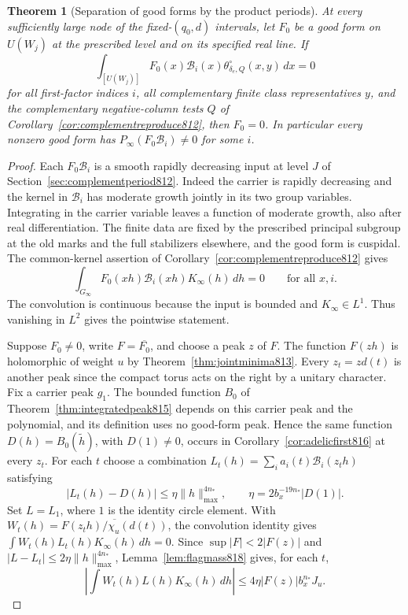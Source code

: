 \documentclass[a4paper,11pt]{article}
\newtheorem{theorem}[proposition]{Theorem}
\theoremstyle{definition}
\theoremstyle{remark}
\numberwithin{equation}{section}
\begin{document}
\begin{theorem}[Separation of good forms by the product periods]
\leavevmode\label{thm:complexseparation818}
At every sufficiently large node of the fixed-\((q_0,d)\)
intervals, let \(F_0\) be a good form on \(U(W_j)\) at the
prescribed level and on its specified real line. If
\[
 \int_{[U(W_j)]} F_0(x)\mathcal B_i(x)
                  \theta^\circ_{\delta_e,Q}(x,y)\,dx=0
\]
for all first-factor indices \(i\), all complementary
finite class representatives \(y\), and the complementary
negative-column tests \(Q\) of
Corollary~\ref{cor:complementreproduce812}, then \(F_0=0\).
In particular every nonzero good form has
\(P_\infty(F_0\mathcal B_i)\ne0\) for some \(i\).
\end{theorem}
\begin{proof}
Each \(F_0\mathcal B_i\) is a smooth rapidly decreasing
input at level \(J\) of Section~\ref{sec:complementperiod812}.
Indeed the carrier is rapidly decreasing and the kernel
in \(\mathcal B_i\) has moderate growth jointly in its
two group variables. Integrating in the carrier variable
leaves a function of moderate growth, also after real
differentiation. The finite data are fixed by the prescribed
principal subgroup at the old marks and the full stabilizers
elsewhere, and the good form is cuspidal. The common-kernel
assertion of Corollary~\ref{cor:complementreproduce812} gives
\[
   \int_{G_\infty} F_0(xh)\mathcal B_i(xh)K_\infty(h)\,dh=0
                 \qquad\text{for all }x,i .
\]
The convolution is continuous because the input is bounded
and \(K_\infty\in L^1\). Thus vanishing in \(L^2\) gives
the pointwise statement.

Suppose \(F_0\ne0\), write \(F=\overline{F_0}\), and choose
a peak \(z\) of \(F\). The function \(F(zh)\) is holomorphic
of weight \(u\) by Theorem~\ref{thm:jointminima813}. Every
\(z_t=z d(t)\) is another peak since the compact torus acts
on the right by a unitary character. Fix a carrier peak \(g_1\).
The bounded function \(B_0\) of Theorem~\ref{thm:integratedpeak815}
depends on this carrier peak and the polynomial, and its
definition uses no good-form peak. Hence the same function
\(D(h)=B_0(\widetilde h)\), with \(D(1)\ne0\), occurs in
Corollary~\ref{cor:adelicfirst816} at every \(z_t\). For each
\(t\) choose a combination
\(L_t(h)=\sum_i a_i(t)\mathcal B_i(z_t h)\) satisfying
\[
    |L_t(h)-D(h)|\le\eta\|h\|_{\max}^{4n_*},\qquad
    \eta=2b_x^{-19n_*}|D(1)|.
\]
Set \(L=L_1\), where \(1\) is the identity circle element.
With \(W_t(h)=\overline{F(z_t h)/\chi_u(d(t))}\), the
convolution identity gives
\(\int W_t(h)L_t(h)K_\infty(h)\,dh=0\).
Since \(\sup|F|<2|F(z)|\) and
\(|L-L_t|\le2\eta\|h\|_{\max}^{4n_*}\),
Lemma~\ref{lem:flagmass818} gives, for each \(t\),
\[
   \left|\int W_t(h)L(h)K_\infty(h)\,dh\right|
      \le4\eta|F(z)|b_x^{n_*}J_u .
\]


\end{proof}
\end{document}
